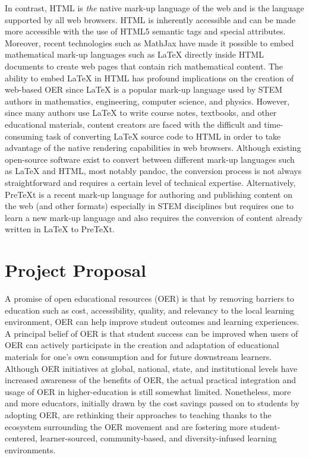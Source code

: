 \documentclass[11pt]{article}
\begin{document}
In contrast, HTML is \textit{the} native mark-up language of the web and is the language supported by all web browsers.  HTML is inherently accessible and can be made more accessible with the use of HTML5 semantic tags and special attributes.  Moreover, recent technologies such as MathJax have made it possible to embed mathematical mark-up languages such as LaTeX directly inside HTML documents to create web pages that contain rich mathematical content.  The ability to embed LaTeX in HTML has profound implications on the creation of web-based OER since LaTeX is a popular mark-up language used by STEM authors in mathematics, engineering, computer science, and physics.  However, since many authors use LaTeX to write course notes, textbooks, and other educational materials, content creators are faced with the difficult and time-consuming task of converting LaTeX source code to HTML in order to take advantage of the native rendering capabilities in web browsers.  Although existing open-source software exist to convert between different mark-up languages such as LaTeX and HTML, most notably \textsf{pandoc}, the conversion process is not always straightforward and requires a certain level of technical expertise.  Alternatively, PreTeXt is a recent mark-up language for authoring and publishing content on the web (and other formats) especially in STEM disciplines but requires one to learn a new mark-up language and also requires the conversion of content already written in LaTeX to PreTeXt.

\section{Project Proposal}

A promise of open educational resources (OER) is that by removing barriers to education such as cost, accessibility, quality, and relevancy to the local learning environment, OER can help improve student outcomes and learning experiences.  A principal belief of OER is that student success can be improved when users of OER can actively participate in the creation and adaptation of educational materials for one's own consumption and for future downstream learners.  Although OER initiatives at global, national, state, and institutional levels have increased awareness of the benefits of OER, the actual practical integration and usage of OER in higher-education is still somewhat limited.  Nonetheless, more and more educators, initially drawn by the cost savings passed on to students by adopting OER, are rethinking their approaches to teaching thanks to the ecosystem surrounding the OER movement and are fostering more student-centered, learner-sourced, community-based, and diversity-infused learning environments.
\end{document}
